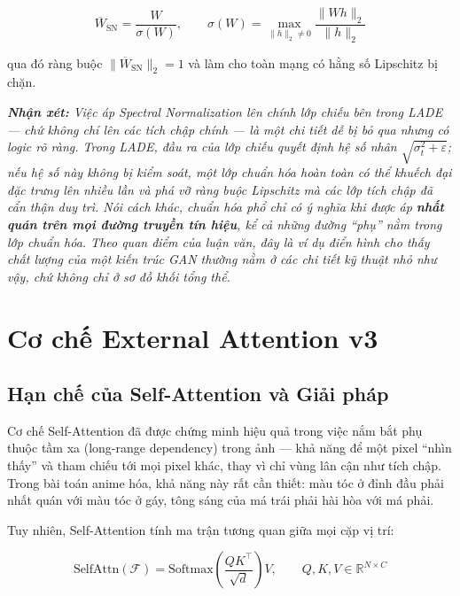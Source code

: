 \begin{equation}
\label{eq:spectral_norm}
\overline{W}_{\text{SN}} = \frac{W}{\sigma(W)}, \qquad \sigma(W) = \max_{\|h\|_2 \neq 0} \frac{\|W h\|_2}{\|h\|_2}
\end{equation}

\noindent qua đó ràng buộc $\|\overline{W}_{\text{SN}}\|_2 = 1$ và làm cho toàn mạng có hằng số Lipschitz bị chặn.

\medskip
\noindent\textit{\textbf{Nhận xét:} Việc áp Spectral Normalization lên \textit{chính lớp chiếu bên trong LADE} --- chứ không chỉ lên các tích chập chính --- là một chi tiết dễ bị bỏ qua nhưng có logic rõ ràng. Trong LADE, đầu ra của lớp chiếu quyết định hệ số nhân $\sqrt{\sigma_t^2 + \varepsilon}$; nếu hệ số này không bị kiểm soát, một lớp chuẩn hóa hoàn toàn có thể khuếch đại đặc trưng lên nhiều lần và phá vỡ ràng buộc Lipschitz mà các lớp tích chập đã cẩn thận duy trì. Nói cách khác, chuẩn hóa phổ chỉ có ý nghĩa khi được áp \textbf{nhất quán trên mọi đường truyền tín hiệu}, kể cả những đường ``phụ'' nằm trong lớp chuẩn hóa. Theo quan điểm của luận văn, đây là ví dụ điển hình cho thấy chất lượng của một kiến trúc GAN thường nằm ở các chi tiết kỹ thuật nhỏ như vậy, chứ không chỉ ở sơ đồ khối tổng thể.}

\section{Cơ chế External Attention v3}
\label{sec:external_attention}

\subsection{Hạn chế của Self-Attention và Giải pháp}
\label{subsec:attention_motivation}

Cơ chế Self-Attention \cite{Zhang2019} đã được chứng minh hiệu quả trong việc nắm bắt phụ thuộc tầm xa (long-range dependency) trong ảnh --- khả năng để một pixel ``nhìn thấy'' và tham chiếu tới mọi pixel khác, thay vì chỉ vùng lân cận như tích chập. Trong bài toán anime hóa, khả năng này rất cần thiết: màu tóc ở đỉnh đầu phải nhất quán với màu tóc ở gáy, tông sáng của má trái phải hài hòa với má phải.

Tuy nhiên, Self-Attention tính ma trận tương quan giữa mọi cặp vị trí:

\begin{equation}
\label{eq:self_attention}
\text{SelfAttn}(\mathcal{F}) = \text{Softmax}\!\left(\frac{Q K^{\top}}{\sqrt{d}}\right) V, \qquad Q, K, V \in \mathbb{R}^{N \times C}
\end{equation}

